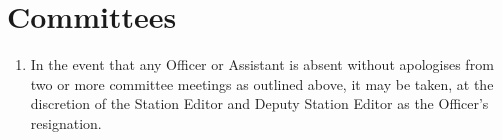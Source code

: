 \section{Committees}

\begin{enumerate}[label*=\thesection.\arabic*.,itemsep=3ex]
    
    
    
    
    
    \item In the event that any Officer or Assistant is absent without apologises from two or more committee meetings as outlined above, it may be taken, at the discretion of the Station Editor and Deputy Station Editor as the Officer's resignation.
\end{enumerate}
